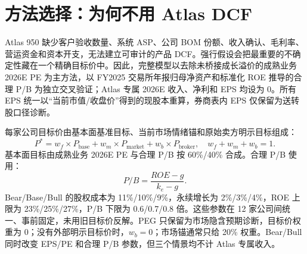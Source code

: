 \section{方法选择：为何不用 Atlas DCF}

Atlas 950 缺少客户验收数量、系统 ASP、公司 BOM 份额、收入确认、毛利率、营运资金和资本开支，无法建立可审计的产品 DCF。强行假设会把最重要的不确定性藏在一个精确目标价中。因此，完整模型以去除未桥接成长溢价的成熟业务 2026E PE 为主方法，以 FY2025 交易所年报归母净资产和标准化 ROE 推导的合理 P/B 为独立交叉验证；Atlas 专属 2026E 收入、净利和 EPS 均设为 0。所有 EPS 统一以“当前市值/收盘价”得到的现股本重算，券商表内 EPS 仅保留为送转股口径诊断。

每家公司目标价由基本面基准目标、当前市场情绪锚和原始卖方明示目标组成：
\[
P^{*}=w_f\times P_{\mathrm{base}}+w_m\times P_{\mathrm{market}}+w_b\times P_{\mathrm{broker}},\quad w_f+w_m+w_b=1.
\]
基本面目标由成熟业务 2026E PE 与合理 P/B 按 60\%/40\% 合成。合理 P/B 使用：
\[
P/B=\frac{ROE-g}{k_e-g}.
\]
Bear/Base/Bull 的股权成本为 11\%/10\%/9\%，永续增长为 2\%/3\%/4\%，ROE 上限为 23\%/25\%/27\%，P/B 下限为 0.6/0.7/0.8 倍。这些参数在 12 家公司间统一、事前固定，未用旧目标价反解。PEG 只保留为市场隐含预期诊断，目标价权重为 0；没有外部明示目标价时，$w_b=0$；市场锚通常只给 20\% 权重。Bear/Bull 同时改变 EPS/PE 和合理 P/B 参数，但三个情景均不计 Atlas 专属收入。

